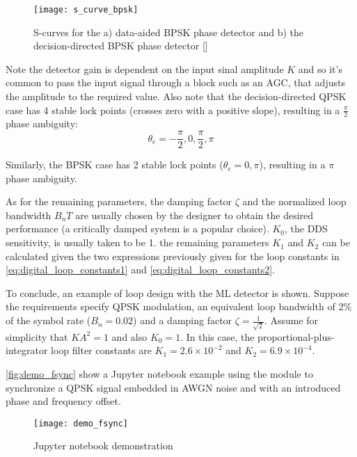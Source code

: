 \begin{figure}[ht]
  \centering
  \texttt{[image: s\_curve\_bpsk]}
  \caption{S-curves for the a) data-aided BPSK phase detector and b) the decision-directed BPSK phase detector [\citeauthor{digcomm_discrete_approach}]}
  \label{fig:s_curve_bpsk}
\end{figure}

Note the detector gain is dependent on the input sinal amplitude $K$ and so it's common to pass the input signal through a block such as an AGC, that adjusts the amplitude to the required value. Also note that the decision-directed QPSK case has 4 stable lock points (crosses zero with a positive slope), resulting in a $\frac{\pi}{2}$ phase ambiguity:
\begin{equation}
  \theta_e=-\frac{\pi}{2},0,\frac{\pi}{2},\pi
\end{equation}

Similarly, the BPSK case has 2 stable lock points ($\theta_e=0,\pi$), resulting in a $\pi$ phase ambiguity.

As for the remaining parameters, the damping factor $\zeta$ and the normalized loop bandwidth $B_nT$ are usually chosen by the designer to obtain the desired performance (a critically damped system is a popular choice). $K_0$, the DDS sensitivity, is usually taken to be 1. the remaining parameters $K_1$ and $K_2$ can be calculated given the two expressions previously given for the loop constants in \eqref{eq:digital_loop_constants1} and \eqref{eq:digital_loop_constants2}.

To conclude, an example of loop design with the ML detector is shown. Suppose the requirements specify QPSK modulation, an equivalent loop bandwidth of 2\% of the symbol rate ($B_n=0.02$) and a damping factor $\zeta=\frac{1}{\sqrt{2}}$. Assume for simplicity that $KA^2=1$ and also $K_0=1$. In this case, the proportional-plus-integrator loop filter constants are $K_1=2.6\times10^{-2}$ and $K_2=6.9\times10^{-4}$.

\autoref{fig:demo_fsync} show a Jupyter notebook example using the  module to synchronize a QPSK signal embedded in AWGN noise and with an introduced phase and frequency offset.

\begin{figure}[ht]
  \centering
  \texttt{[image: demo\_fsync]}
  \caption{ Jupyter notebook demonstration}
  \label{fig:demo_fsync}
\end{figure}

